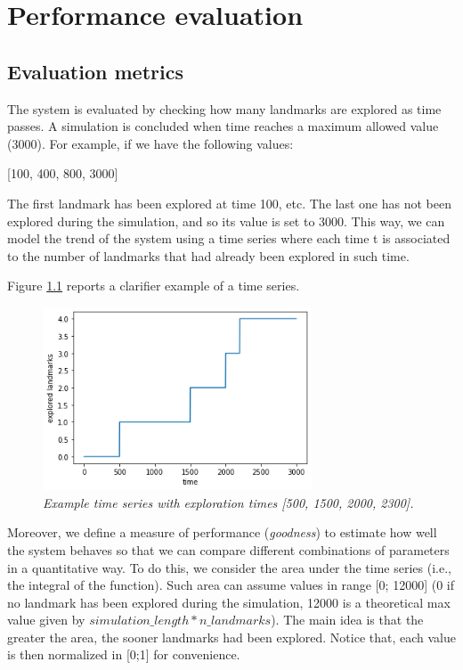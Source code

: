 \chapter{Performance evaluation}

\section{Evaluation metrics}

The system is evaluated by checking how many landmarks are explored as time passes. A simulation is concluded when time reaches a maximum allowed value (3000). For example, if we have the following values:

\begin{center}
[100, 400, 800, 3000]
\end{center}

\noindent
The first landmark has been explored at time 100, etc. The last one has not been explored during the simulation, and so its value is set to 3000. This way, we can model the trend of the system using a time series where each time t is associated to the number of landmarks that had already been explored in such time. 

\noindent
Figure \ref{fig:ts} reports a clarifier example of a time series.

\begin{figure}[H]
\centering
\includegraphics[width=8cm, keepaspectratio]{images/ts.png}
\caption{\textit{Example time series with exploration times [500, 1500, 2000, 2300].}}
\label{fig:ts}
\end{figure}

\smallskip
Moreover, we define a measure of performance (\textit{goodness}) to estimate how well the system behaves so that we can compare different combinations of parameters in a quantitative way. To do this, we consider the area under the time series (i.e., the integral of the function). Such area can assume values in range [0; 12000] (0 if no landmark has been explored during the simulation, 12000 is a theoretical max value given by $simulation\_length * n\_landmarks$). The main idea is that the greater the area, the sooner landmarks had been explored. Notice that, each value is then normalized in [0;1] for convenience.

